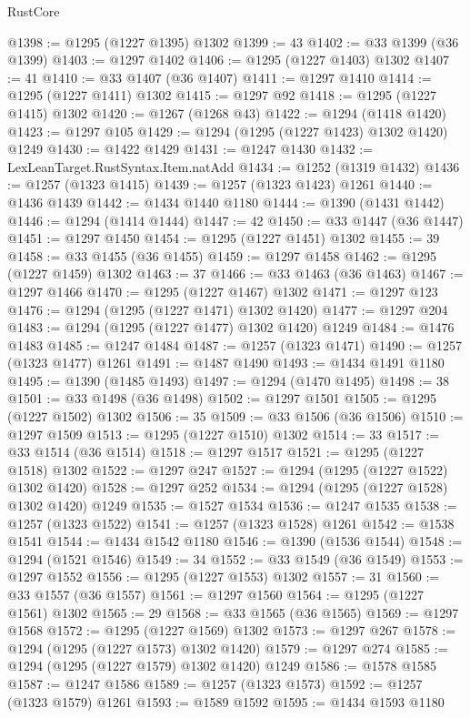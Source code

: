 \begin{lexlean}{RustCore}
\begin{coremodule}
@1398 := @1295 (@1227 @1395) @1302
@1399 := 43
@1402 := @33 @1399 (@36 @1399)
@1403 := @1297 @1402
@1406 := @1295 (@1227 @1403) @1302
@1407 := 41
@1410 := @33 @1407 (@36 @1407)
@1411 := @1297 @1410
@1414 := @1295 (@1227 @1411) @1302
@1415 := @1297 @92
@1418 := @1295 (@1227 @1415) @1302
@1420 := @1267 (@1268 @43)
@1422 := @1294 (@1418 @1420)
@1423 := @1297 @105
@1429 := @1294 (@1295 (@1227 @1423) @1302 @1420) @1249
@1430 := @1422 @1429
@1431 := @1247 @1430
@1432 := LexLeanTarget.RustSyntax.Item.natAdd
@1434 := @1252 (@1319 @1432)
@1436 := @1257 (@1323 @1415)
@1439 := @1257 (@1323 @1423) @1261
@1440 := @1436 @1439
@1442 := @1434 @1440 @1180
@1444 := @1390 (@1431 @1442)
@1446 := @1294 (@1414 @1444)
@1447 := 42
@1450 := @33 @1447 (@36 @1447)
@1451 := @1297 @1450
@1454 := @1295 (@1227 @1451) @1302
@1455 := 39
@1458 := @33 @1455 (@36 @1455)
@1459 := @1297 @1458
@1462 := @1295 (@1227 @1459) @1302
@1463 := 37
@1466 := @33 @1463 (@36 @1463)
@1467 := @1297 @1466
@1470 := @1295 (@1227 @1467) @1302
@1471 := @1297 @123
@1476 := @1294 (@1295 (@1227 @1471) @1302 @1420)
@1477 := @1297 @204
@1483 := @1294 (@1295 (@1227 @1477) @1302 @1420) @1249
@1484 := @1476 @1483
@1485 := @1247 @1484
@1487 := @1257 (@1323 @1471)
@1490 := @1257 (@1323 @1477) @1261
@1491 := @1487 @1490
@1493 := @1434 @1491 @1180
@1495 := @1390 (@1485 @1493)
@1497 := @1294 (@1470 @1495)
@1498 := 38
@1501 := @33 @1498 (@36 @1498)
@1502 := @1297 @1501
@1505 := @1295 (@1227 @1502) @1302
@1506 := 35
@1509 := @33 @1506 (@36 @1506)
@1510 := @1297 @1509
@1513 := @1295 (@1227 @1510) @1302
@1514 := 33
@1517 := @33 @1514 (@36 @1514)
@1518 := @1297 @1517
@1521 := @1295 (@1227 @1518) @1302
@1522 := @1297 @247
@1527 := @1294 (@1295 (@1227 @1522) @1302 @1420)
@1528 := @1297 @252
@1534 := @1294 (@1295 (@1227 @1528) @1302 @1420) @1249
@1535 := @1527 @1534
@1536 := @1247 @1535
@1538 := @1257 (@1323 @1522)
@1541 := @1257 (@1323 @1528) @1261
@1542 := @1538 @1541
@1544 := @1434 @1542 @1180
@1546 := @1390 (@1536 @1544)
@1548 := @1294 (@1521 @1546)
@1549 := 34
@1552 := @33 @1549 (@36 @1549)
@1553 := @1297 @1552
@1556 := @1295 (@1227 @1553) @1302
@1557 := 31
@1560 := @33 @1557 (@36 @1557)
@1561 := @1297 @1560
@1564 := @1295 (@1227 @1561) @1302
@1565 := 29
@1568 := @33 @1565 (@36 @1565)
@1569 := @1297 @1568
@1572 := @1295 (@1227 @1569) @1302
@1573 := @1297 @267
@1578 := @1294 (@1295 (@1227 @1573) @1302 @1420)
@1579 := @1297 @274
@1585 := @1294 (@1295 (@1227 @1579) @1302 @1420) @1249
@1586 := @1578 @1585
@1587 := @1247 @1586
@1589 := @1257 (@1323 @1573)
@1592 := @1257 (@1323 @1579) @1261
@1593 := @1589 @1592
@1595 := @1434 @1593 @1180

\end{coremodule}
\end{lexlean}
